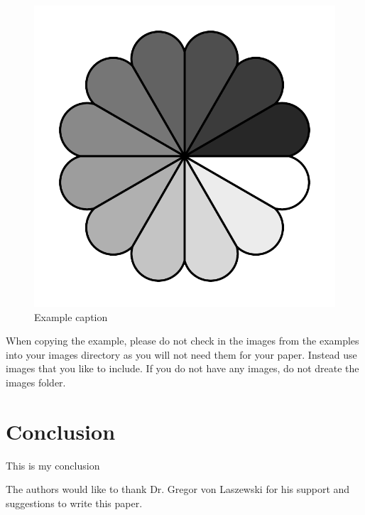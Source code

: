 \documentclass[sigconf]{acmart}
\begin{document}
\begin{figure}[!ht]
  \centering\includegraphics[width=\columnwidth]{images/rosette.pdf}
  \caption{Example caption}\label{f:fly}
\end{figure}

When copying the example, please do not check in the images from the
examples into your images directory as you will not need them for your
paper. Instead use images that you like to include. If you do not have
any images, do not dreate the images folder.

\section{Conclusion}

This is my conclusion

\begin{acks}

  The authors would like to thank Dr. Gregor von Laszewski for his
  support and suggestions to write this paper.

\end{acks}


 

\appendix


\end{document}

